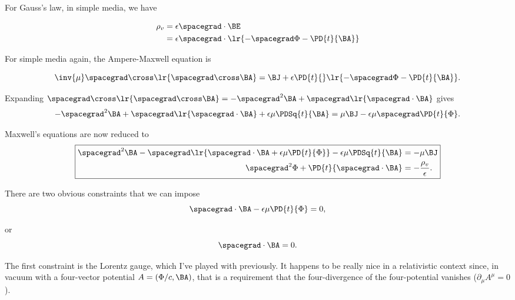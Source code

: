 For Gauss's law, in simple media, we have

\begin{dmath}\label{eqn:transverseGauge:140}
\begin{aligned}
\rho_v
&=
\epsilon \spacegrad \cdot \BE \\
&=
\epsilon \spacegrad \cdot \lr{ -\spacegrad \Phi - \PD{t}{\BA} }
\end{aligned}
\end{dmath}

For simple media again, the Ampere-Maxwell equation is

\begin{dmath}\label{eqn:transverseGauge:100}
\inv{\mu} \spacegrad \cross \lr{ \spacegrad \cross \BA } = \BJ + \epsilon \PD{t}{} \lr{ -\spacegrad \Phi - \PD{t}{\BA} }.
\end{dmath}

Expanding \( \spacegrad \cross \lr{ \spacegrad \cross \BA } = -\spacegrad^2 \BA + \spacegrad \lr{ \spacegrad \cdot \BA } \) gives
\begin{dmath}\label{eqn:transverseGauge:120}
-\spacegrad^2 \BA + \spacegrad \lr{ \spacegrad \cdot \BA } + \epsilon \mu \PDSq{t}{\BA} = \mu \BJ - \epsilon \mu \spacegrad \PD{t}{\Phi}.
\end{dmath}

Maxwell's equations are now reduced to
\begin{dmath}\label{eqn:transverseGauge:180}
\boxed{
\begin{aligned}
\spacegrad^2 \BA - \spacegrad \lr{ \spacegrad \cdot \BA + \epsilon \mu \PD{t}{\Phi}} - \epsilon \mu \PDSq{t}{\BA} &= -\mu \BJ \\
\spacegrad^2 \Phi + \PD{t}{\spacegrad \cdot \BA} &= -\frac{\rho_v }{\epsilon}.
\end{aligned}
}
\end{dmath}

There are two obvious constraints that we can impose
\begin{equation}\label{eqn:transverseGauge:200}
\spacegrad \cdot \BA - \epsilon \mu \PD{t}{\Phi} = 0,
\end{equation}

or
\begin{equation}\label{eqn:transverseGauge:220}
\spacegrad \cdot \BA = 0.
\end{equation}

The first constraint is the Lorentz gauge, which I've played with previously.  It happens to be really nice in a relativistic context since, in vacuum with a four-vector potential \( A = (\Phi/c, \BA) \), that is a requirement that the four-divergence of the four-potential vanishes (\( \partial_\mu A^\mu = 0 \)).

